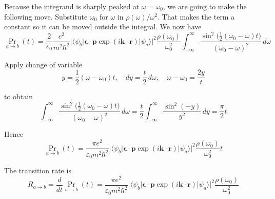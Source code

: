 Because the integrand is sharply peaked at $\omega=\omega_0$,
we are going to make the following move.
Substitute $\omega_0$ for $\omega$ in $\rho(\omega)/\omega^2$.
That makes the term a constant so it can be moved outside the integral.
We now have
\begin{equation*}
\Pr_{a\rightarrow b}(t)
=\frac{2}{\varepsilon_0}
\frac{e^2}{m^2\hbar^2}
\bigl|\langle\psi_b|\boldsymbol{\epsilon}\cdot\mathbf p\exp(i\mathbf k\cdot\mathbf r)|\psi_a\rangle\bigr|^2
\frac{\rho(\omega_0)}{\omega_0^2}
\int_{-\infty}^\infty
\frac{\sin^2\bigl(\tfrac{1}{2}(\omega_0-\omega)t\bigr)}{(\omega_0-\omega)^2}\,d\omega
\end{equation*}

Apply change of variable
\begin{equation*}
y=\frac{1}{2}(\omega-\omega_0)t,\quad
dy=\frac{t}{2}\,d\omega,\quad
\omega-\omega_0=\frac{2y}{t}
\end{equation*}

to obtain
\begin{equation*}
\int_{-\infty}^\infty
\frac{\sin^2\bigl(\tfrac{1}{2}(\omega_0-\omega)t\bigr)}{(\omega_0-\omega)^2}\,d\omega
=\frac{t}{2}\int_{-\infty}^\infty\frac{\sin^2(-y)}{y^2}\,dy
=\frac{\pi}{2}t
\end{equation*}

Hence
\begin{equation*}
\Pr_{a\rightarrow b}(t)
=\frac{\pi e^2}{\varepsilon_0m^2\hbar^2}
\bigl|\langle\psi_b|\boldsymbol{\epsilon}\cdot\mathbf p\exp(i\mathbf k\cdot\mathbf r)|\psi_a\rangle\bigr|^2
\frac{\rho(\omega_0)}{\omega_0^2}
t
\end{equation*}

The transition rate is
\begin{equation*}
R_{a\rightarrow b}=\frac{d}{dt}\Pr_{a\rightarrow b}(t)
=\frac{\pi e^2}{\varepsilon_0m^2\hbar^2}
\bigl|\langle\psi_b|\boldsymbol{\epsilon}\cdot\mathbf p\exp(i\mathbf k\cdot\mathbf r)|\psi_a\rangle\bigr|^2
\frac{\rho(\omega_0)}{\omega_0^2}
\end{equation*}

